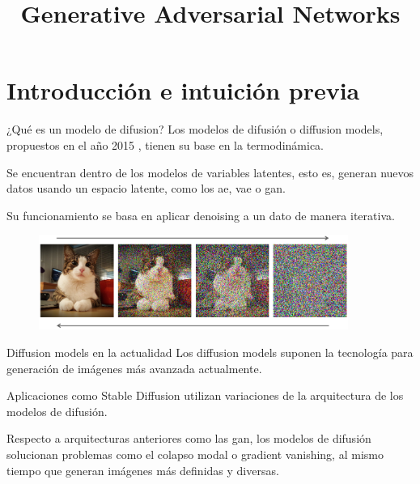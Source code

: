 



\title{Generative Adversarial Networks}


\maketitle

\section{Introducción e intuición previa}

\begin{frame}{¿Qué es un modelo de difusion?}
Los modelos de difusión o \alert{diffusion models}, propuestos en el año 2015 \cite{sohl2015deep}, tienen su base en la termodinámica.

Se encuentran dentro de los \alert{modelos de variables latentes}, esto es, generan nuevos datos usando un espacio latente, como los \gls{ae}, \gls{vae} o \gls{gan}.

Su funcionamiento se basa en aplicar \alert{denoising} a un dato de manera iterativa.

\begin{figure}
    \centering
    \includegraphics[width=0.9\textwidth]{Slides/figures/Diffusion_Models/Generation-with-Diffusion-Models.png}
    \caption{\cite{vahdat2022improving}}
\end{figure}
\end{frame}

\begin{frame}{Diffusion models en la actualidad}
Los diffusion models suponen la tecnología para generación de imágenes \alert{más avanzada} actualmente.

Aplicaciones como \alert{Stable Diffusion} utilizan variaciones de la arquitectura de los modelos de difusión.

Respecto a arquitecturas anteriores como las \gls{gan}, los modelos de difusión solucionan problemas como el \alert{colapso modal o gradient vanishing}, al mismo tiempo que generan imágenes \alert{más definidas y diversas}.
\end{frame}

